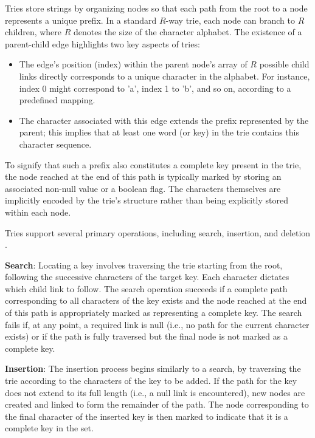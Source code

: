Tries store strings by organizing nodes so that each path from the root to a node represents a unique prefix. In a standard $R$-way trie, each node can branch to $R$ children, where $R$ denotes the size of the character alphabet. The existence of a parent-child edge highlights two key aspects of tries:
\begin{itemize}
    \item The edge's position (index) within the parent node's array of $R$ possible child links directly corresponds to a unique character in the alphabet. For instance, index 0 might correspond to 'a', index 1 to 'b', and so on, according to a predefined mapping.
    \item The character associated with this edge extends the prefix represented by the parent; this implies that at least one word (or key) in the trie contains this character sequence.
\end{itemize}
To signify that such a prefix also constitutes a complete key present in the trie, the node reached at the end of this path is typically marked by storing an associated non-null value or a boolean flag. The characters themselves are implicitly encoded by the trie's structure rather than being explicitly stored within each node.


Tries support several primary operations, including search, insertion, and deletion \cite{SedgewickWayne2011}.

\textbf{Search}: Locating a key involves traversing the trie starting from the root, following the successive characters of the target key. Each character dictates which child link to follow. The search operation succeeds if a complete path corresponding to all characters of the key exists and the node reached at the end of this path is appropriately marked as representing a complete key. The search fails if, at any point, a required link is null (i.e., no path for the current character exists) or if the path is fully traversed but the final node is not marked as a complete key.

\textbf{Insertion}: The insertion process begins similarly to a search, by traversing the trie according to the characters of the key to be added. If the path for the key does not extend to its full length (i.e., a null link is encountered), new nodes are created and linked to form the remainder of the path. The node corresponding to the final character of the inserted key is then marked to indicate that it is a complete key in the set.


